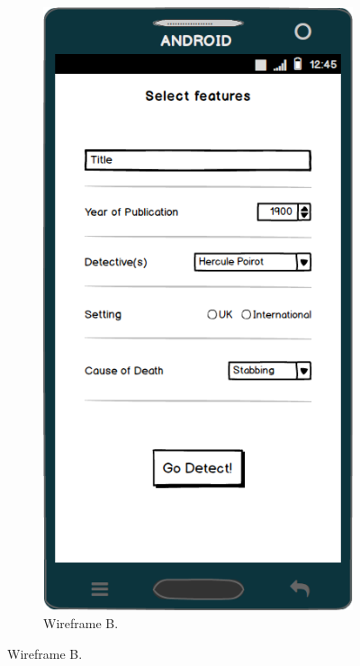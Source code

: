 \documentclass{mproj}
\begin{document}
\begin{figure}
	\quad
	\begin{subfigure}{0.3\textwidth}
		\includegraphics[width=\textwidth]{images/single_text_only}
		\caption{Wireframe B.}
		\label{fig:wireframeB}		
	\end{subfigure}


\end{figure}
\end{document}
